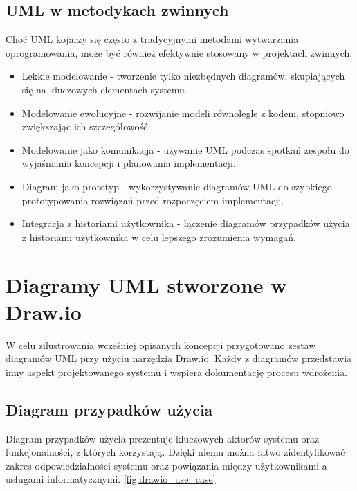 \documentclass[12pt,a4paper]{article}
\begin{document}
\subsection{UML w metodykach zwinnych}
Choć UML kojarzy się często z tradycyjnymi metodami wytwarzania oprogramowania, może być również efektywnie stosowany w projektach zwinnych:

\begin{itemize}
    \item Lekkie modelowanie - tworzenie tylko niezbędnych diagramów, skupiających się na kluczowych elementach systemu.
    
    \item Modelowanie ewolucyjne - rozwijanie modeli równolegle z kodem, stopniowo zwiększając ich szczegółowość.
    
    \item Modelowanie jako komunikacja - używanie UML podczas spotkań zespołu do wyjaśniania koncepcji i planowania implementacji.
    
    \item Diagram jako prototyp - wykorzystywanie diagramów UML do szybkiego prototypowania rozwiązań przed rozpoczęciem implementacji.
    
    \item Integracja z historiami użytkownika - łączenie diagramów przypadków użycia z historiami użytkownika w celu lepszego zrozumienia wymagań.
\end{itemize}

\section{Diagramy UML stworzone w Draw.io}

W celu zilustrowania wcześniej opisanych koncepcji przygotowano zestaw diagramów UML przy użyciu narzędzia Draw.io. Każdy z diagramów przedstawia inny aspekt projektowanego systemu i wspiera dokumentację procesu wdrożenia.

\subsection{Diagram przypadków użycia}
Diagram przypadków użycia prezentuje kluczowych aktorów systemu oraz funkcjonalności, z których korzystają. Dzięki niemu można łatwo zidentyfikować zakres odpowiedzialności systemu oraz powiązania między użytkownikami a usługami informatycznymi. \ref{fig:drawio_use_case}
\end{document}
